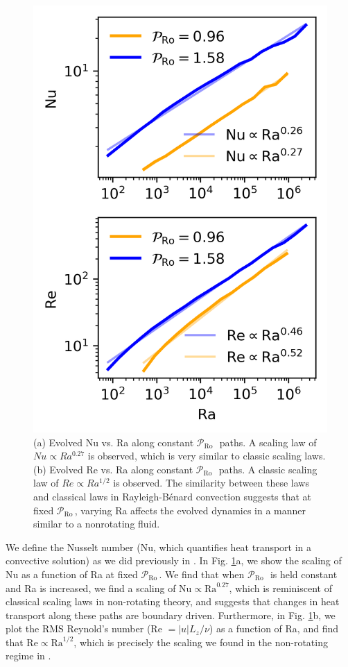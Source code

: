 \documentclass[twocolumn, amsmath, amsfonts, amssymb]{aastex62}
\newcommand{\RB}{Rayleigh-B\'{e}nard }
\newcommand{\pro}{\ensuremath{\mathcal{P}_{\text{Ro}}\,}}
\begin{document}
\begin{figure}[h]
\includegraphics{./figs/nu_and_re.png}
\caption{(a) Evolved Nu vs. Ra along constant
\pro$\,$ paths. A scaling law of $Nu \propto Ra^{0.27}$ is observed, which
is very similar to classic scaling laws.
(b) Evolved Re vs. Ra along constant \pro$\,$ paths.
A classic scaling law of $Re \propto Ra^{1/2}$ is observed. The
similarity between these laws and
classical laws in \RB convection suggests that at fixed \pro, varying Ra
affects the evolved dynamics in a manner similar to a nonrotating fluid.
\label{fig:nu_and_re} }
\end{figure}

We define the Nusselt number (Nu, which quantifies heat transport in a convective
solution) as we did previously in \AB.
In Fig. \ref{fig:nu_and_re}a, we show the scaling of Nu as a function
of Ra at fixed \pro. We find that when \pro$\,$ is held constant and
Ra is increased, we find a scaling of $\text{Nu} \propto \text{Ra}^{0.27}$,
which is reminiscent of classical scaling laws in non-rotating theory,
and suggests that changes in heat transport along these paths are boundary
driven. Furthermore, in Fig. \ref{fig:nu_and_re}b, we plot the RMS Reynold's
number (Re $= |u| L_z / \nu$) as a function of Ra, and find that 
$\text{Re} \propto \text{Ra}^{1/2}$, which is precisely the scaling we found
in the non-rotating regime in \AB.
\end{document}
